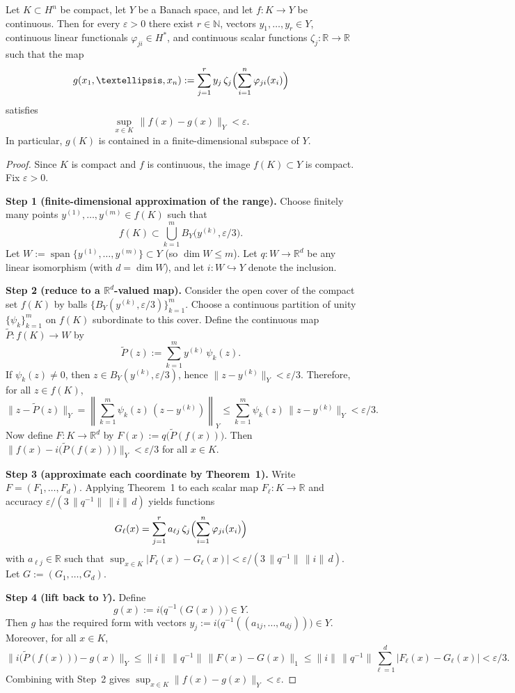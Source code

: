 \documentclass[10pt,a4paper]{amsart}
\begin{document}
\begin{theorem}
Let $K\subset H^n$ be compact, let $Y$ be a Banach space, and let $f\colon K\to Y$ be continuous.
Then for every $\varepsilon>0$ there exist $r\in\mathbb{N}$, vectors $y_1,\dots,y_r\in Y$, continuous linear functionals $\varphi_{ji}\in H^*$, and continuous scalar functions $\zeta_j\colon\mathbb{R}\to\mathbb{R}$ such that the map
\[
  g(x_1,\dots,x_n):=\sum_{j=1}^r y_j\,\zeta_j\Bigl(\sum_{i=1}^n \varphi_{ji}(x_i)\Bigr)
\]
satisfies
\[
  \sup_{x\in K}\,\|f(x)-g(x)\|_Y<\varepsilon.
\]
In particular, $g(K)$ is contained in a finite-dimensional subspace of $Y$.
\end{theorem}

\begin{proof}
Since $K$ is compact and $f$ is continuous, the image $f(K)\subset Y$ is compact.
Fix $\varepsilon>0$.

\textbf{Step 1 (finite-dimensional approximation of the range).}
Choose finitely many points $y^{(1)},\dots,y^{(m)}\in f(K)$ such that
\[
  f(K)\subset \bigcup_{k=1}^m B_Y\bigl(y^{(k)},\varepsilon/3\bigr).
\]
Let $W:=\operatorname{span}\{y^{(1)},\dots,y^{(m)}\}\subset Y$ (so $\dim W\le m$).
Let $q\colon W\to\mathbb{R}^d$ be any linear isomorphism (with $d=\dim W$), and let $i\colon W\hookrightarrow Y$ denote the inclusion.

\textbf{Step 2 (reduce to a $\mathbb{R}^d$-valued map).}
Consider the open cover of the compact set $f(K)$ by balls $\{B_Y(y^{(k)},\varepsilon/3)\}_{k=1}^m$.
Choose a continuous partition of unity $\{\psi_k\}_{k=1}^m$ on $f(K)$ subordinate to this cover.
Define the continuous map $\widetilde P\colon f(K)\to W$ by
\[
  \widetilde P(z):=\sum_{k=1}^m y^{(k)}\,\psi_k(z).
\]
If $\psi_k(z)\neq 0$, then $z\in B_Y(y^{(k)},\varepsilon/3)$, hence $\|z-y^{(k)}\|_Y<\varepsilon/3$.
Therefore, for all $z\in f(K)$,
\[
  \|z-\widetilde P(z)\|_Y
  =\left\|\sum_{k=1}^m \psi_k(z)\,(z-y^{(k)})\right\|_Y
  \le \sum_{k=1}^m \psi_k(z)\,\|z-y^{(k)}\|_Y
  <\varepsilon/3.
\]
Now define $F\colon K\to\mathbb{R}^d$ by $F(x):=q\bigl(\widetilde P(f(x))\bigr)$.
Then $\|f(x)-i\bigl(\widetilde P(f(x))\bigr)\|_Y<\varepsilon/3$ for all $x\in K$.

\textbf{Step 3 (approximate each coordinate by Theorem~1).}
Write $F=(F_1,\dots,F_d)$.
Applying Theorem~1 to each scalar map $F_\ell\colon K\to\mathbb{R}$ and accuracy $\varepsilon/(3\,\|q^{-1}\|\,\|i\|\,d)$ yields functions
\[
  G_\ell(x)=\sum_{j=1}^{r} a_{\ell j}\,\zeta_j\Bigl(\sum_{i=1}^n \varphi_{ji}(x_i)\Bigr)
\]
with $a_{\ell j}\in\mathbb{R}$ such that $\sup_{x\in K}|F_\ell(x)-G_\ell(x)|<\varepsilon/(3\,\|q^{-1}\|\,\|i\|\,d)$.
Let $G:=(G_1,\dots,G_d)$.

\textbf{Step 4 (lift back to $Y$).}
Define
\[
  g(x):=i\bigl(q^{-1}(G(x))\bigr)\in Y.
\]
Then $g$ has the required form with vectors $y_j:=i\bigl(q^{-1}((a_{1j},\dots,a_{dj}))\bigr)\in Y$.
Moreover, for all $x\in K$,
\[
  \|i\bigl(\widetilde P(f(x))\bigr)-g(x)\|_Y
  \le \|i\|\,\|q^{-1}\|\,\|F(x)-G(x)\|_1
  \le \|i\|\,\|q^{-1}\|\sum_{\ell=1}^d |F_\ell(x)-G_\ell(x)|
  <\varepsilon/3.
\]
Combining with Step~2 gives $\sup_{x\in K}\|f(x)-g(x)\|_Y<\varepsilon$.
\end{proof}
\end{document}
